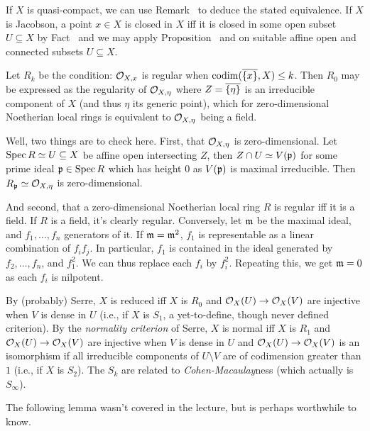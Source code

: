 \documentclass[a4paper,parskip=half,numbers=enddot, DIV=12]{scrreprt}
\begin{document}
\begin{rem}
\begin{alphanumerate}
         If $X$ is quasi-compact, we can use Remark~ to deduce the stated equivalence. If $X$ is Jacobson, a point $x\in X$ is closed in $X$ iff it is closed in some open subset $U\subseteq X$ by Fact~ and we may apply Proposition~ and  on suitable affine open and connected subsets $U\subseteq X$.
    \item 
        Let $R_k$ be the condition: $\mathcal{O}_{X,x}$ is regular when $\operatorname{codim}(\overline{\{x\}}, X) \leq k$. Then $R_0$ may be expressed as the regularity of $\mathcal{O}_{X,\eta}$ where $Z=\overline{\left\{\eta\right\}}$ is an irreducible component of $X$ (and thus $\eta$ its generic point), which for zero-dimensional Noetherian local rings is equivalent to $\mathcal{O}_{X,\eta}$ being a field. 
        
        Well, two things are to check here. First, that $\mathcal{O}_{X,\eta}$ is zero-dimensional. Let $\operatorname{Spec} R\simeq U\subseteq X$ be affine open intersecting $Z$, then $Z\cap U\simeq V(\mathfrak{p})$ for some prime ideal $\mathfrak{p}\in\operatorname{Spec} R$ which has height $0$ as $V(\mathfrak{p})$ is maximal irreducible. Then $R_{\mathfrak{p}}\simeq \mathcal{O}_{X,\eta}$ is zero-dimensional.  
        
        And second, that a zero-dimensional Noetherian local ring $R$ is regular iff it is a field. If $R$ is a field, it's clearly regular. Conversely, let $\mathfrak{m}$ be the maximal ideal, and $f_1,\ldots,f_n$ generators of it. If $\mathfrak{m}=\mathfrak{m}^2$, $f_1$ is representable as a linear combination of $f_if_j$. In particular, $f_1$ is contained in the ideal generated by $f_2,\ldots,f_n$, and $f_1^2$. We can thus replace each $f_i$ by $f_i^2$. Repeating this, we get $\mathfrak{m}=0$ as each $f_i$ is nilpotent.
        
          By (probably) Serre, $X$ is reduced iff $X$ is $R_0$ and $\Oo_X(U)\morphism \Oo_X(V)$ are injective when $V$ is dense in $U$ (i.e., if $X$ is $S_1$, a yet-to-define, though never defined criterion). By the \emph{normality criterion} of Serre, $X$ is normal iff $X$ is $R_1$ and $\Oo_X(U)\morphism \Oo_X(V)$ are injective when $V$ is dense in $U$ and $\Oo_X(U)\morphism \Oo_X(V)$ is an isomorphism if all irreducible components of $U\setminus V$ are of codimension greater than $1$ (i.e., if $X$ is $S_2$). The $S_k$ are related  to \emph{Cohen-Macaulay}ness (which actually is $S_\infty$).
    \end{alphanumerate}
\end{rem}
The following lemma wasn't covered in the lecture, but is perhaps worthwhile to know.
\end{document}
